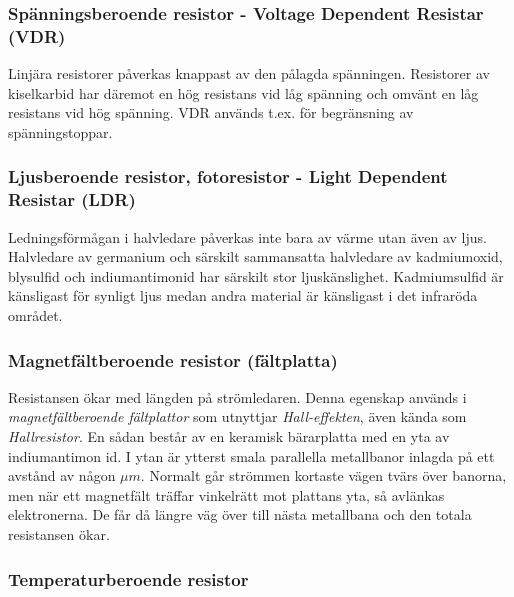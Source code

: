 \subsubsection{Spänningsberoende resistor - Voltage Dependent Resistar (VDR)}

Linjära resistorer påverkas knappast av den pålagda spänningen. Resistorer av
kiselkarbid har däremot en hög resistans vid låg spänning och omvänt en låg
resistans vid hög spänning. VDR används t.ex. för begränsning av
spänningstoppar.

\subsubsection{Ljusberoende resistor, fotoresistor - Light Dependent Resistar (LDR)}

Ledningsförmågan i halvledare påverkas inte bara av värme utan även av ljus.
Halvledare av germanium och särskilt sammansatta halvledare av kadmiumoxid,
blysulfid och indiumantimonid har särskilt stor ljuskänslighet. Kadmiumsulfid
är känsligast för synligt ljus medan andra material är känsligast i det
infraröda området.

\subsubsection{Magnetfältberoende resistor (fältplatta)}

Resistansen ökar med längden på strömledaren. Denna egenskap används i
\emph{magnetfältberoende fältplattor} som utnyttjar \emph{Hall-effekten}, även
kända som \emph{Hallresistor}. En sådan består av en keramisk bärarplatta med
en yta av indiumantimon id. I ytan är ytterst smala parallella metallbanor
inlagda på ett avstånd av någon \(\mu m\). Normalt går strömmen kortaste vägen
tvärs över banorna, men när ett magnetfält träffar vinkelrätt mot plattans yta,
så avlänkas elektronerna. De får då längre väg över till nästa metallbana och
den totala resistansen ökar.

\subsubsection{Temperaturberoende resistor}

